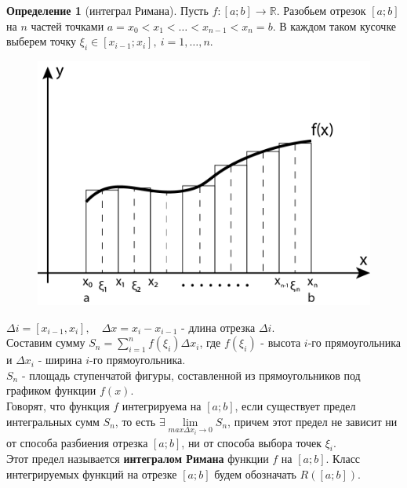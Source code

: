 \documentclass{report}
\theoremstyle{definition}
\newtheorem{definition}{Определение}[section]
\begin{document}
\begin{definition}[интеграл Римана]
  Пусть $f:[a;b]\rightarrow\mathbb{R}$. Разобьем отрезок $[a;b]$ на $n$ частей точками $a = x_{0} < x_{1} < \ldots <
    x_{n-1} < x_{n} = b$. В каждом таком кусочке выберем точку $\xi_{i} \in [x_{i-1};x_{i}], \ i = 1,\ldots ,n$.\\

  \begin{figure}[H]
    \begin{center}
      \includegraphics[scale=0.7]{graph1.png}\label{figure1}
    \end{center}
  \end{figure}

  $\Delta i = [x_{i-1}, x_{i}], \quad \Delta x = x_{i} - x_{i-1}$ - длина отрезка $\Delta i$.\\

  Составим сумму $S_{n} = \sum_{i=1}^{n} f(\xi_{i})\Delta x_{i}$, где $f(\xi_{i})$ - высота $i$-го прямоугольника и
  $\Delta x_{i}$ - ширина $i$-го прямоугольника.\\

  $S_{n}$ - площадь ступенчатой фигуры, составленной из прямоугольников под графиком функции $f(x)$.\\

  Говорят, что функция $f$ интегрируема на $[a;b]$, если существует предел интегральных сумм $S_{n}$, то есть
  $\exists \underset{max\Delta x_{i}\rightarrow0}{\lim}S_{n}$, причем этот предел не зависит ни от способа разбиения
  отрезка $[a;b]$, ни от способа выбора точек $\xi_{i}$.\\

  Этот предел называется \textbf{интегралом Римана} функции $f$ на $[a;b]$. Класс интегрируемых функций на отрезке
  $[a;b]$ будем обозначать $R([a;b])$.
\end{definition}
\end{document}
